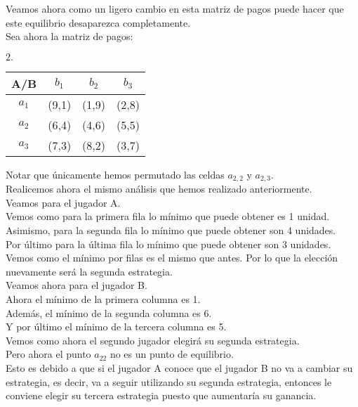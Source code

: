 \documentclass[10pt,a4paper]{book}
\begin{document}
Veamos ahora como un ligero cambio en esta matriz de pagos puede hacer que este equilibrio desaparezca completamente.\\

Sea ahora la matriz de pagos:\\

\begin{center}
		$2. \quad$
	\begin{tabular}{|c|c|c|c|}
		\hline
		A/B & $b_1$ & $b_2$ & $b_3$ \\
		\hline
		$a_1$ & (9,1) & (1,9) & (2,8)\\
		$a_2$ & (6,4)  & (4,6) & (5,5) \\
		$a_3$ & (7,3) & (8,2) &(3,7) \\
		\hline
	\end{tabular}
\end{center}

Notar que únicamente hemos permutado las celdas $a_{2,2}$ y $a_{2,3}$.\\

Realicemos ahora el mismo análisis que hemos realizado anteriormente.\\

Veamos para el jugador A.\\

Vemos como para la primera fila lo mínimo que puede obtener es 1 unidad.\\
Asimismo, para la segunda fila lo mínimo que puede obtener son 4 unidades.\\
Por último para la última fila lo mínimo que puede obtener son 3 unidades.\\

Vemos como el mínimo por filas es el mismo que antes. Por lo que la elección nuevamente será la segunda estrategia.\\

Veamos ahora para el jugador B.\\

Ahora el mínimo de la primera columna es 1.\\
Además, el mínimo de la segunda columna es 6.\\
Y por último el mínimo de la tercera columna es 5.\\

Vemos como ahora el segundo jugador elegirá su segunda estrategia. \\

Pero ahora el punto $a_{22}$ no es un punto de equilibrio. \\
Esto es debido a que si el jugador A conoce que el jugador B no va a cambiar su estrategia, es decir, va a seguir utilizando su segunda estrategia, entonces le conviene elegir su tercera estrategia puesto que aumentaría su ganancia.\\
\end{document}
